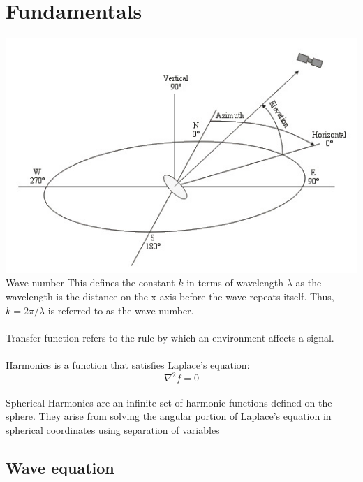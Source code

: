 \chapter{Fundamentals}
\label{chap:fundamentals}

\includegraphics{images/Elevation_and_azimuth_angle.jpg}
\newpage
\Large
Wave number
\normalsize
This defines the constant $k$ in terms of wavelength $\lambda$ as the wavelength is the distance on the
x-axis before the wave repeats itself. Thus, $k = 2\pi/\lambda$ is referred to as the
wave number.\cite{Fuller1995}\\\\
\Large
Transfer function
\normalsize
refers to the rule by which an environment affects a signal.\cite{Regulinski1962}\\\\
\Large
Harmonics
\normalsize
is a function that satisfies Laplace's equation:\\
\begin{equation}
    \nabla ^2f=0
\end{equation}\\
\Large
Spherical Harmonics
\normalsize
are an infinite set of harmonic functions defined on the sphere. They arise from solving the angular portion of Laplace's equation in spherical coordinates using separation of variables\cite{Atkinson2012}


\section{Wave equation}
